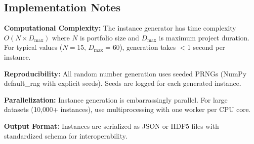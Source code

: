 \subsection{Implementation Notes}

\textbf{Computational Complexity:} The instance generator has time complexity $O(N \times D_{\max})$ where $N$ is portfolio size and $D_{\max}$ is maximum project duration. For typical values ($N=15$, $D_{\max}=60$), generation takes $<$1 second per instance.

\textbf{Reproducibility:} All random number generation uses seeded PRNGs (NumPy default\_rng with explicit seeds). Seeds are logged for each generated instance.

\textbf{Parallelization:} Instance generation is embarrassingly parallel. For large datasets (10,000+ instances), use multiprocessing with one worker per CPU core.

\textbf{Output Format:} Instances are serialized as JSON or HDF5 files with standardized schema for interoperability.
